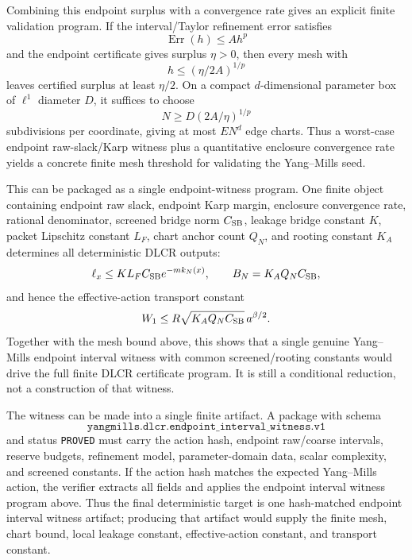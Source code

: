Combining this endpoint surplus with a convergence rate gives an explicit
finite validation program. If the interval/Taylor refinement error satisfies
\[
  \operatorname{Err}(h)\leq A h^p
\]
and the endpoint certificate gives surplus $\eta>0$, then every mesh with
\[
  h\leq (\eta/2A)^{1/p}
\]
leaves certified surplus at least $\eta/2$. On a compact $d$-dimensional
parameter box of $\ell^1$ diameter $D$, it suffices to choose
\[
  N\geq D(2A/\eta)^{1/p}
\]
subdivisions per coordinate, giving at most $E N^d$ edge charts. Thus a
worst-case endpoint raw-slack/Karp witness plus a quantitative enclosure
convergence rate yields a concrete finite mesh threshold for validating the
Yang--Mills seed.

This can be packaged as a single endpoint-witness program. One finite object
containing endpoint raw slack, endpoint Karp margin, enclosure convergence
rate, rational denominator, screened bridge norm $C_{\rm SB}$, leakage bridge
constant $K$, packet Lipschitz constant $L_F$, chart anchor count $Q_N$, and
rooting constant $K_A$ determines all deterministic DLCR outputs:
\[
  \ell_x\leq K L_F C_{\rm SB} e^{-m k_N(x)},\qquad
  B_N=K_A Q_N C_{\rm SB},
\]
and hence the effective-action transport constant
\[
  W_1\leq R\sqrt{K_A Q_N C_{\rm SB}}\,a^{\beta/2}.
\]
Together with the mesh bound above, this shows that a single genuine
Yang--Mills endpoint interval witness with common screened/rooting constants
would drive the full finite DLCR certificate program. It is still a conditional
reduction, not a construction of that witness.

The witness can be made into a single finite artifact. A package with schema
\[
  \texttt{yangmills.dlcr.endpoint\_interval\_witness.v1}
\]
and status \texttt{PROVED} must carry the action hash, endpoint raw/coarse
intervals, reserve budgets, refinement model, parameter-domain data, scalar
complexity, and screened constants. If the action hash matches the expected
Yang--Mills action, the verifier extracts all fields and applies the endpoint
interval witness program above. Thus the final deterministic target is one
hash-matched endpoint interval witness artifact; producing that artifact would
supply the finite mesh, chart bound, local leakage constant, effective-action
constant, and transport constant.

